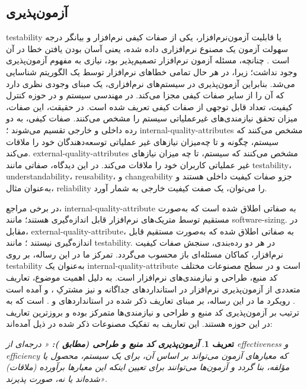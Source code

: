 \documentclass[a4paper,12pt]{article}
\newtheorem{definition}{تعریف}[section]
\begin{document}
\subsection{آزمون‌پذیری}
\gls{testability}
یا قابلیت آزمون‌نرم‌افزار، یکی از صفات کیفی نرم‌افزار و بیانگر درجه سهولت آزمون یک مصنوع نرم‌افزاری داده شده، یعنی آسان بودن یافتن خطا در آن است
 \cite{ISO/IEC/IEEE/24765:2017}. 
  چنانچه، مسئله آزمون‌ نرم‌افزار تصمیم‌پذیر بود، نیازی به مفهوم آزمون‌پذیری وجود نداشت؛ زیرا، در هر حال تمامی خطاهای نرم‌افزار توسط یک الگوریتم شناسایی می‌شد. بنابراین آزمون‌پذیری در سیستم‌های نرم‌افزاری، یک مبنای وجودی نظری دارد که آن را از سایر صفات کیفی مجزا می‌کند.
در مهندسی سیستم و در حوزه کنترل کیفیت، تعداد قابل توجهی از صفات کیفی تعریف شده است. 
در حقیقت، این صفات، میزان تحقق نیازمندی‌های غیرعملیاتی سیستم را مشخص می‌کنند. صفات کیفی، به دو رده داخلی و خارجی تقسیم می‌شوند 
\cite{Freeman2010}؛
\glspl{internal-quality-attribute}
مشخص می‌کنند که سیستم، چگونه و تا چه‌میزان نیازهای غیر عملیاتی توسعه‌دهندگان خود را ملاقات می‌کند.
% 
\glspl{external-quality-attribute}
مشخص می‌کنند که سیستم، تا چه میزان نیازهای غیر عملیاتی کاربران خود را ملاقات می‌کند. در این دیدگاه، صفاتی مانند 
\gls{testability}،
\gls{understandability}،
\gls{reusability}،
و
\gls{changeability}
 جزو صفات کیفیت داخلی هستند و به‌عنوان مثال، 
\gls{reliability}
 را می‌توان، یک صفت کیفیت خارجی به شمار آورد.
\par
در برخی مراجع، 
\gls{internal-quality-attribute}
به صفاتی اطلاق شده است که به‌صورت مستقیم توسط متریک‌های نرم‌افزار قابل اندازه‌گیری هستند؛ مانند 
\gls{software-sizing}.
در مقابل،
\gls{external-quality-attribute}،
به صفاتی اطلاق شده که به‌صورت مستقیم قابل اندازه‌گیری نیستند
\cite{Elish2012}؛
مانند 
\gls{testability}.
%
در هر دو رده‌بندی، سنجش صفات کیفیت نرم‌افزار، کماکان مسئله‌ای باز محسوب می‌گردد. تمرکز ما در این رساله، بر روی 
 \gls{testability}
به‌عنوان یک 
\gls{internal-quality-attribute}
است و در سطح مصنوعات مختلف کد منبع، طراحی و نیازمندی‌های نرم‌افزار است.
%
به دلیل اهمیت موضوع، تعاریف متعددی از آزمون‌پذیری نرم‌افزار در استانداردهای جداگانه و نیز مشترکِ
،
 و 
 آمده است
\cite{ISO/IEC/25010:2011, ISO/IEC/IEEE/24765:2017, ISO/IEC/IEEE/29148:2018, ISO/IEC/IEEE/12207:2017}. 
رویکرد ما در این رساله، بر مبنای تعاریف ذکر شده در استاندارد‌های 
 \cite{ISO/IEC/25010:2011}
و
\cite{ISO/IEC/IEEE/24765:2017}. 
است که به ترتیب بر آزمون‌پذیری کد منبع و طراحی
\cite{ISO/IEC/25010:2011}
 و نیازمندی‌ها 
\cite{ISO/IEC/IEEE/24765:2017}
متمرکز بوده و بروزترین تعاریف در این حوزه هستند. این تعاریف به تفکیک مصنوعات ذکر شده در  ذیل آمده‌اند:
\begin{definition}\label{def:source-code-and-design-testability}
\textbf{
 آزمون‌پذیری کد منبع و طراحی (مطابق
  \cite{ISO/IEC/25010:2011}):
}
«%
{\textit{%
درجه‌ای از 
\gls{effectiveness}
و 
\gls{efficiency}
که معیارهای آزمون می‌تواند بر اساس آن، برای یک سیستم، محصول یا مؤلفه، بنا گردد و آزمون‌ها می‌توانند برای تعیین اینکه این معیارها برآورده (ملاقات) شده‌اند یا نه، صورت پذیرند}}». 
\end{definition}
\end{document}
